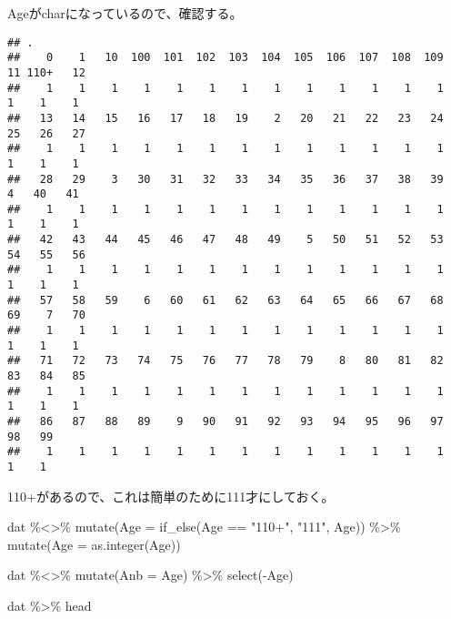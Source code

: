 \documentclass[
]{book}
\newenvironment{Shaded}{\begin{snugshade}}{\end{snugshade}}
\newcommand{\AttributeTok}[1]{\textcolor[rgb]{0.77,0.63,0.00}{#1}}
\newcommand{\FunctionTok}[1]{\textcolor[rgb]{0.00,0.00,0.00}{#1}}
\newcommand{\NormalTok}[1]{#1}
\newcommand{\SpecialCharTok}[1]{\textcolor[rgb]{0.00,0.00,0.00}{#1}}
\newcommand{\StringTok}[1]{\textcolor[rgb]{0.31,0.60,0.02}{#1}}
\begin{document}
Ageがcharになっているので、確認する。

\begin{Shaded}
\end{Shaded}

\begin{verbatim}
## .
##    0    1   10  100  101  102  103  104  105  106  107  108  109   11 110+   12 
##    1    1    1    1    1    1    1    1    1    1    1    1    1    1    1    1 
##   13   14   15   16   17   18   19    2   20   21   22   23   24   25   26   27 
##    1    1    1    1    1    1    1    1    1    1    1    1    1    1    1    1 
##   28   29    3   30   31   32   33   34   35   36   37   38   39    4   40   41 
##    1    1    1    1    1    1    1    1    1    1    1    1    1    1    1    1 
##   42   43   44   45   46   47   48   49    5   50   51   52   53   54   55   56 
##    1    1    1    1    1    1    1    1    1    1    1    1    1    1    1    1 
##   57   58   59    6   60   61   62   63   64   65   66   67   68   69    7   70 
##    1    1    1    1    1    1    1    1    1    1    1    1    1    1    1    1 
##   71   72   73   74   75   76   77   78   79    8   80   81   82   83   84   85 
##    1    1    1    1    1    1    1    1    1    1    1    1    1    1    1    1 
##   86   87   88   89    9   90   91   92   93   94   95   96   97   98   99 
##    1    1    1    1    1    1    1    1    1    1    1    1    1    1    1
\end{verbatim}

110+があるので、これは簡単のために111才にしておく。

\begin{Shaded}
\begin{Highlighting}[]
\NormalTok{dat }\SpecialCharTok{\%\textless{}\textgreater{}\%}
        \FunctionTok{mutate}\NormalTok{(}\AttributeTok{Age =} \FunctionTok{if\_else}\NormalTok{(Age }\SpecialCharTok{==} \StringTok{"110+"}\NormalTok{, }\StringTok{"111"}\NormalTok{, Age)) }\SpecialCharTok{\%\textgreater{}\%} 
        \FunctionTok{mutate}\NormalTok{(}\AttributeTok{Age =} \FunctionTok{as.integer}\NormalTok{(Age)) }

\NormalTok{dat }\SpecialCharTok{\%\textless{}\textgreater{}\%}
        \FunctionTok{mutate}\NormalTok{(}\AttributeTok{Anb =}\NormalTok{ Age) }\SpecialCharTok{\%\textgreater{}\%} 
        \FunctionTok{select}\NormalTok{(}\SpecialCharTok{{-}}\NormalTok{Age)}

\NormalTok{dat }\SpecialCharTok{\%\textgreater{}\%}\NormalTok{ head}
\end{Highlighting}
\end{Shaded}
\end{document}
